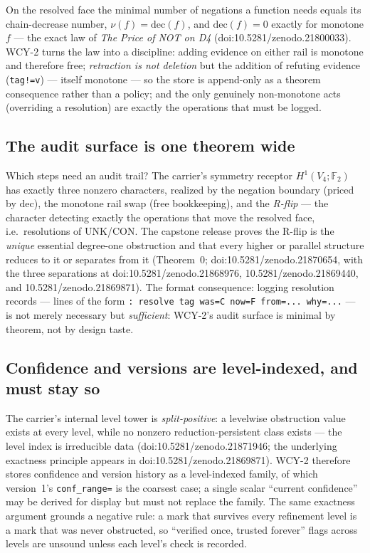 \documentclass[11pt,a4paper]{article}
\begin{document}
On the resolved face the minimal number of negations a function needs
equals its chain-decrease number, $\nu(f) = \mathrm{dec}(f)$, and
$\mathrm{dec}(f) = 0$ exactly for monotone $f$ --- the exact law of
\emph{The Price of NOT on D4} (doi:10.5281/zenodo.21800033). WCY-2
turns the law into a discipline: adding evidence on either rail is
monotone and therefore free; \emph{retraction is not deletion} but the
addition of refuting evidence (\texttt{tag!=v}) --- itself monotone ---
so the store is append-only as a theorem consequence rather than a
policy; and the only genuinely non-monotone acts (overriding a
resolution) are exactly the operations that must be logged.

\subsection{The audit surface is one theorem wide}

Which steps need an audit trail? The carrier's symmetry receptor
$H^1(V_4;\mathbb{F}_2)$ has exactly three nonzero characters, realized
by the negation boundary (priced by $\mathrm{dec}$), the monotone rail
swap (free bookkeeping), and the \emph{R-flip} --- the character
detecting exactly the operations that move the resolved face, i.e.\
resolutions of $\mathrm{UNK}$/$\mathrm{CON}$. The capstone release
proves the R-flip is the \emph{unique} essential degree-one obstruction
and that every higher or parallel structure reduces to it or separates
from it (Theorem~0; doi:10.5281/zenodo.21870654, with the three
separations at doi:10.5281/zenodo.21868976, 10.5281/zenodo.21869440,
and 10.5281/zenodo.21869871). The format consequence: logging
resolution records --- lines of the form
\texttt{:\ resolve tag was=C now=F from=...\ why=...} --- is not merely
necessary but \emph{sufficient}: WCY-2's audit surface is minimal by
theorem, not by design taste.

\subsection{Confidence and versions are level-indexed, and must stay so}

The carrier's internal level tower is \emph{split-positive}: a levelwise
obstruction value exists at every level, while no nonzero
reduction-persistent class exists --- the level index is irreducible
data (doi:10.5281/zenodo.21871946; the underlying exactness principle
appears in doi:10.5281/zenodo.21869871). WCY-2 therefore stores
confidence and version history as a level-indexed family, of which
version~1's \texttt{conf\_range=} is the coarsest case; a single scalar
``current confidence'' may be derived for display but must not replace
the family. The same exactness argument grounds a negative rule: a mark
that survives every refinement level is a mark that was never
obstructed, so ``verified once, trusted forever'' flags across levels
are unsound unless each level's check is recorded.
\end{document}
